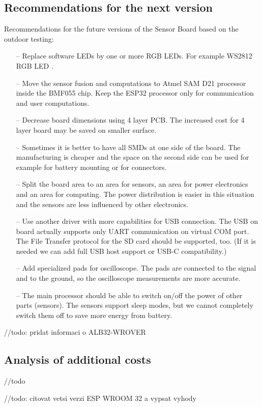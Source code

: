 \subsection{Recommendations for the next version}
\label{recommendationsNextVerison}
Recommendations for the future versions of the Sensor Board based on the outdoor testing:
\begin{itemize}
	\item[--] Replace software LEDs by one or more RGB LEDs. For example WS2812 RGB LED \cite{AdafruitLED}.
	\item[--] Move the sensor fusion and computations to Atmel SAM D21 \cite{AtmelSAM} processor inside the BMF055 \cite{BMF055} chip. Keep the ESP32 \cite{ESP32} processor only for communication and user computations.
	\item[--] Decrease board dimensions using 4 layer PCB. The increased cost for 4 layer board may be saved on smaller surface.
	\item[--] Sometimes it is better to have all SMDs at one side of the board. The manufacturing is cheaper and the space on the second side can be used for example for battery mounting or for connectors.
	\item[--] Split the board area to an area for sensors, an area for power electronics and an area for computing. The power distribution is easier in this situation and the sensors are less influenced by other electronics.
	\item[--] Use another driver with more capabilities for USB connection. The USB on board actually supports only UART communication on virtual COM port. The File Transfer protocol for the SD card should be supported, too. (If it is needed we can add full USB host support or USB-C compatibility.)
	\item[--] Add specialized pads for oscilloscope. The pads are connected to the signal and to the ground, so the oscilloscope measurements are more accurate.
	\item[--] The main processor should be able to switch on/off the power of other parts (sensors). The sensors support sleep modes, but we cannot completely switch them off to save more energy from battery.
\end{itemize}

//todo: pridat informaci o ALB32-WROVER
	
\subsection{Analysis of additional costs}
\label{HWadditionalCosts}
//todo

//todo: citovat vetsi verzi ESP WROOM 32 a vypsat vyhody
